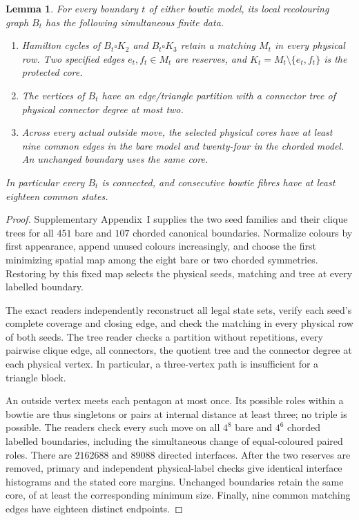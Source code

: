 \documentclass[11pt]{article}
\newtheorem{lemma}[theorem]{Lemma}
\theoremstyle{remark}
\numberwithin{equation}{section}
\numberwithin{table}{section}
\begin{document}
\begin{lemma}\label{lem:bowtie-product-data}
For every boundary $t$ of either bowtie model, its local recolouring
graph $B_t$ has the following simultaneous finite data.
\begin{enumerate}
\item Hamilton cycles of $B_t\square K_2$ and $B_t\square K_3$
retain a matching $M_t$ in every physical row. Two specified edges
$e_t,f_t\in M_t$ are reserves, and $K_t=M_t\setminus\{e_t,f_t\}$
is the protected core.
\item The vertices of $B_t$ have an edge/triangle partition with a
connector tree of physical connector degree at most two.
\item Across every actual outside move, the selected physical cores
have at least nine common edges in the bare model and twenty-four
in the chorded model. An unchanged boundary uses the same core.
\end{enumerate}
In particular every $B_t$ is connected, and consecutive bowtie fibres
have at least eighteen common states.
\end{lemma}
\begin{proof}
Supplementary Appendix~I supplies the two seed families and their
clique trees for all $451$ bare and $107$ chorded canonical boundaries.
Normalize colours by first appearance, append unused colours increasingly,
and choose the first minimizing spatial map among the eight bare or two
chorded symmetries. Restoring by this fixed map selects the physical
seeds, matching and tree at every labelled boundary.

The exact readers independently reconstruct all legal state sets, verify
each seed's complete coverage and closing edge, and check the matching
in every physical row of both seeds. The tree reader checks a partition
without repetitions, every pairwise clique edge, all connectors, the
quotient tree and the connector degree at each physical vertex.
In particular, a three-vertex path is insufficient for a triangle block.

An outside vertex meets each pentagon at most once. Its possible roles
within a bowtie are thus singletons or pairs at internal distance at
least three; no triple is possible. The readers check every such move
on all $4^8$ bare and $4^6$ chorded labelled boundaries, including the
simultaneous change of equal-coloured paired roles. There are
$2162688$ and $89088$ directed interfaces. After the two reserves are
removed, primary and independent physical-label checks give identical
interface histograms and the stated core margins. Unchanged boundaries
retain the same core, of at least the corresponding minimum size.
Finally, nine common matching edges have eighteen distinct endpoints.
\end{proof}
\end{document}
